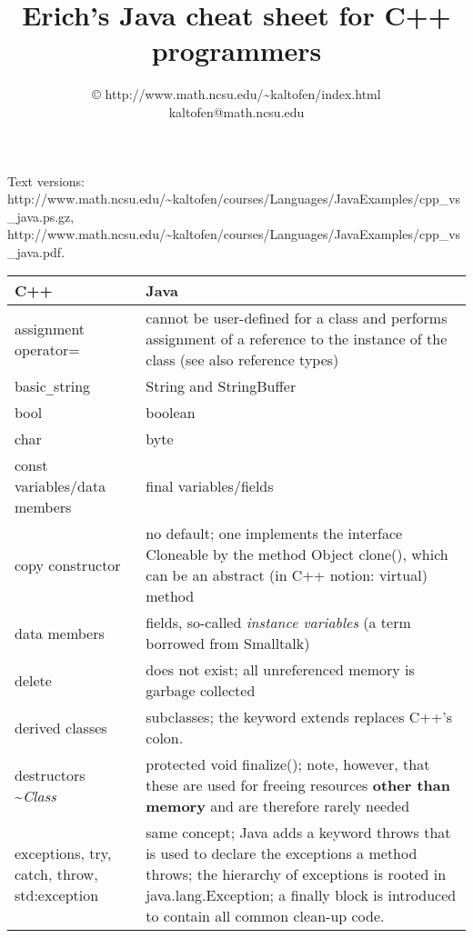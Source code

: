 \documentclass[12pt]{article}
\newcommand{\mycr}{\\\hline}
\newlength{\colwidth}\setlength{\colwidth}{\textwidth}
\newenvironment{mytabular}%
{\par\noindent
\begin{longtable}[l]{%
|p{\colwidth}%
p{\colwidth}|%
}%
}%
{\end{longtable}\par\vspace{\medskipamount}\goodbreak}
\newenvironment{mytabular}
{
\begin{tabular}[t]{|ll|}
}
{
\end{tabular}
}
\newcommand{\code}[1]{{\ttfamily #1}}
\newcommand{\ital}[1]{{{\normalfont\itshape #1}}}%
\begin{document}
\title{Erich's Java cheat sheet for C++ programmers}
\author{\copyright
{}
{http://www.math.ncsu.edu/\~{}kaltofen/index.html}\\
{\ttfamily kaltofen@math.ncsu.edu}}
\maketitle

\begin{htmlonly}
Text versions:
{http://www.math.ncsu.edu/\~{}kaltofen/courses/Languages/JavaExamples/cpp_vs_java.ps.gz},
{http://www.math.ncsu.edu/\~{}kaltofen/courses/Languages/JavaExamples/cpp_vs_java.pdf}.
\end{htmlonly}

\begin{mytabular}%
\hline
{\bfseries C++} & {\bfseries Java} \mycr
\endhead

assignment \code{operator=} & cannot be user-defined for
  a class and performs assignment of a reference to the
  instance of the class (see also reference types)\mycr

\code{basic}\verb!_!\code{string} & \code{String} and \code{StringBuffer}\mycr

\code{bool} & \code{boolean}\mycr

\code{char} & \code{byte}\mycr

\code{const} variables/data members & \code{final} variables/fields\mycr

copy constructor & no default; one implements the interface
  \code{Cloneable} by the method
  \code{Object clone()}, which can be an abstract (in C++ notion: virtual)
  method\mycr

data members & fields, so-called \ital{instance variables}
  (a term borrowed from Smalltalk) \mycr

\code{delete} & does not exist; all unreferenced memory
  is garbage collected \mycr

derived classes & subclasses; the keyword
  \code{extends} replaces C++'s colon. \mycr

destructors \code{\~{}\ital{Class}} &
  \code{protected void finalize()}; note, however,
  that these are used for freeing resources
  {\bfseries other than memory} and are therefore
  rarely needed \mycr

exceptions, \code{try}, \code{catch}, \code{throw},
  \code{std:exception}&
  same concept; Java adds a keyword \code{throws} that
  is used to declare the exceptions a method throws;
  the hierarchy of exceptions is rooted in
  \code{java.lang.Exception};
  a \code{finally} block is introduced to contain
  all common clean-up code. \mycr


\end{mytabular}
\end{document}
